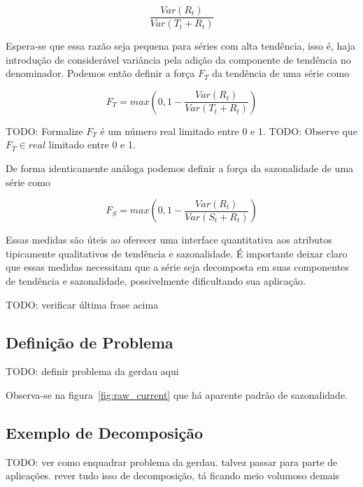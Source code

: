 $$ \frac{Var(R_t)}{Var(T_t + R_t)} $$

Espera-se que essa razão seja pequena para séries com alta tendência, isso é,
haja introdução de considerável variância pela adição da componente de
tendência no denominador. Podemos então definir a força $F_T$ da tendência de
uma série como

$$ F_T = max\left(0, 1 - \frac{Var(R_t)}{Var(T_t + R_t)}\right) $$

TODO: Formalize $F_T$ é um número real limitado entre 0 e 1.
TODO: Observe que $F_T \in real$ limitado entre 0 e 1.

De forma identicamente análoga podemos definir a força da sazonalidade de uma
série como

$$ F_S = max\left(0, 1 - \frac{Var(R_t)}{Var(S_t + R_t)}\right) $$

Essas medidas são úteis ao oferecer uma interface quantitativa aos atributos
tipicamente qualitativos de tendência e sazonalidade. É importante deixar
claro que essas medidas necessitam que a série seja decomposta em suas
componentes de tendência e sazonalidade, possivelmente dificultando sua
aplicação.

TODO: verificar última frase acima

\subsection{Definição de Problema}

TODO: definir problema da gerdau aqui


Observa-se na figura~\ref{fig:raw_current} que há aparente padrão de
sazonalidade.

\subsection{Exemplo de Decomposição}

TODO: ver como enquadrar problema da gerdau. talvez passar para parte de
aplicações. rever tudo isso de decomposição, tá ficando meio volumoso demais





